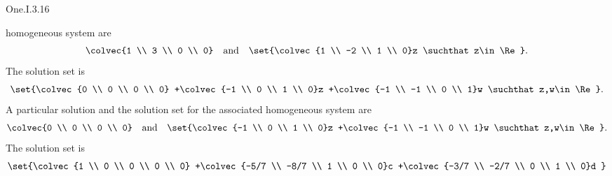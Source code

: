 \begin{ans}{One.I.3.16}
\begin{exparts}
        homogeneous system are
        \begin{equation*}
          \colvec{1 \\ 3 \\ 0 \\ 0}
            \quad\text{and}\quad
          \set{\colvec{1 \\ -2 \\ 1 \\ 0}z
              \suchthat z\in\Re}.
        \end{equation*}
      \partsitem
        The solution set is
        \begin{equation*}
          \set{\colvec{0 \\ 0 \\ 0 \\ 0}
               +\colvec{-1 \\ 0 \\ 1 \\ 0}z
               +\colvec{-1 \\ -1 \\ 0 \\ 1}w
              \suchthat z,w\in\Re}.
        \end{equation*}
        A particular solution and the solution set for the associated
        homogeneous system are
        \begin{equation*}
          \colvec{0 \\ 0 \\ 0 \\ 0}
            \quad\text{and}\quad
          \set{\colvec{-1 \\ 0 \\ 1 \\ 0}z
               +\colvec{-1 \\ -1 \\ 0 \\ 1}w
              \suchthat z,w\in\Re}.
        \end{equation*}
      \partsitem
        The solution set is
        \begin{equation*}
          \set{\colvec{1 \\ 0 \\ 0 \\ 0 \\ 0}
               +\colvec{-5/7 \\ -8/7 \\ 1 \\ 0 \\ 0}c
               +\colvec{-3/7 \\ -2/7 \\ 0 \\ 1 \\ 0}d
}
\end{equation*}
\end{exparts}
\end{ans}

